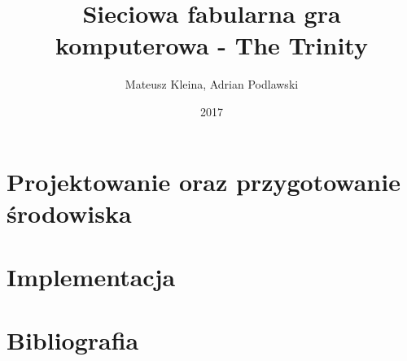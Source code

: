 \documentclass[brudnopis]{xmgr}
\author   {Mateusz Kleina, Adrian Podlawski}
\title    {Sieciowa fabularna gra komputerowa - The Trinity}
\date     {2017}
\begin{document}

\begin{abstract}

\end{abstract}

\maketitle



\chapter{Projektowanie oraz przygotowanie środowiska}





\chapter{Implementacja}










\chapter{Bibliografia}

\end{document}
